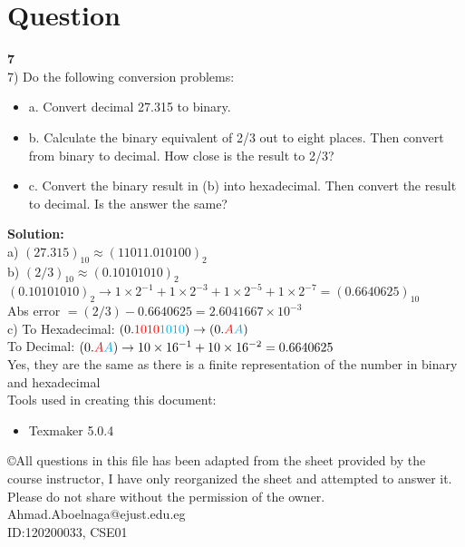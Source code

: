 \documentclass[a4paper,12pt]{extarticle}
\begin{document}
\section*{\LARGE Question }\textbf{\LARGE {7}}\\[0.5cm]
7) Do the following conversion problems:
\begin{itemize}
\item a. Convert decimal 27.315 to binary.
\item b. Calculate the binary equivalent of 2/3 out to eight places. Then convert from binary to decimal. How close is the result to 2/3?
\item c. Convert the binary result in (b) into hexadecimal. Then convert the result to decimal. Is the answer the same?
\end{itemize}
{\color{blue}\textbf{Solution:}}\\[0.3cm]
\indent \color{red} a) \color{black} $(27.315)_{10} \approx(11011.010100)_2 $\\[0.2cm]
\indent \color{red} b) \color{black} $(2/3)_{10} \approx(0.10101010)_2$\\
\indent \quad $(0.10101010)_2 \rightarrow 1 \times 2^{-1} + 1 \times 2^{-3} + 1 \times 2^{-5} + 1 \times 2^{-7}   = (0.6640625)_{10}$\\
\indent \quad Abs error $= (2/3)-0.6640625 =2.6041667 \times 10^{-3} $\\[0.2cm]
\indent \color{red} c) \color{black} To Hexadecimal:
 $\color{black} (0.{\color{red}1010}{\color{cyan}1010}) \rightarrow (0.{\color{red}A}{\color{cyan}A})$\\[0.2cm]
 \indent \quad To Decimal:
 $\color{black} (0.{\color{red}A}{\color{cyan}A}) \rightarrow 10\times 16^{-1} +10\times 16^{-2}  = 0.6640625 \, $\\[0.3cm]
\indent \quad Yes, they are the same as there is a finite representation of the number in binary and hexadecimal\\[11cm]

 Tools used in creating this document:
 \begin{itemize}
 \item Texmaker 5.0.4
\end{itemize}  

 \copyright All questions in this file has been adapted from the sheet provided by the course instructor, I have only reorganized the sheet and attempted to answer it. Please do not share without the permission of the owner.\\
\color{blue}Ahmad.Aboelnaga@ejust.edu.eg\\
ID:120200033, CSE01
 
  
\end{document}
